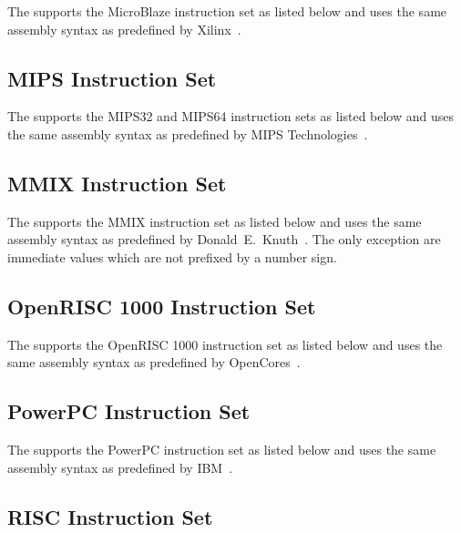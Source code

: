 The \ecs{} supports the MicroBlaze instruction set as listed below and uses the same assembly syntax as predefined by Xilinx~\cite{mibl:instructionset}.
\seemibl


\subsection{MIPS Instruction Set}

The \ecs{} supports the MIPS32 and MIPS64 instruction sets as listed below and uses the same assembly syntax as predefined by MIPS Technologies~\cite{mips:volume1,mips:volume2}.
\seemips


\subsection{MMIX Instruction Set}

The \ecs{} supports the MMIX instruction set as listed below and uses the same assembly syntax as predefined by Donald~E.\ Knuth~\cite{mmixware}.
The only exception are immediate values which are not prefixed by a number sign.
\seemmix


\subsection{OpenRISC 1000 Instruction Set}

The \ecs{} supports the OpenRISC 1000 instruction set as listed below and uses the same assembly syntax as predefined by OpenCores~\cite{or1k:instructionset}.
\seeorok


\subsection{PowerPC Instruction Set}

The \ecs{} supports the PowerPC instruction set as listed below and uses the same assembly syntax as predefined by IBM~\cite{ppc:instructionset}.
\seeppc


\subsection{RISC Instruction Set}

